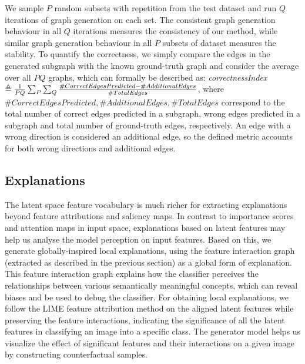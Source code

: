 \documentclass{article}
\newcommand{\ft}[1]{{\textcolor{red}{#1}}}
\newcommand{\ftcom}[2][]{\todo[author=FT, #1]{#2}}
\begin{document}
We sample $P$ random subsets with repetition from the test dataset and run $Q$ iterations of graph generation on each set.
The consistent graph generation behaviour in all $Q$ iterations measures the consistency of our method, while similar graph generation behaviour in all $P$ subsets of dataset measures the stability.
To quantify the correctness, we simply compare the edges in the generated subgraph with the known ground-truth graph and consider the average over all $PQ$ graphs, which can formally be described as: \textit{correctnessIndex} $ \triangleq \frac{1}{PQ} \sum_%
P\sum_%
Q\frac{\#CorrectEdgesPredicted - \#AdditionalEdges}{\#TotalEdges}$, where $\#CorrectEdgesPredicted, \#AdditionalEdges, \#TotalEdges$ correspond to the total number of correct edges predicted in a subgraph, wrong edges predicted in a subgraph and total number of ground-truth edges, respectively.
An edge with a wrong direction is considered an additional edge, so the defined metric accounts for both wrong directions and additional edges. 


\subsection{Explanations}
\label{subsec:exp}
The latent space feature vocabulary is much richer for extracting explanations beyond feature attributions and saliency maps. 
In contrast to importance scores and attention maps in input space, explanations based on latent features may help us analyse the model perception on input features.
Based on this, we generate globally-inspired local explanations, using the feature interaction graph (extracted as described in the previous section) as a global form of explanation. 
This feature interaction graph explains how the classifier perceives the relationships between various semantically meaningful concepts, which can reveal biases and be used to debug the classifier.
For obtaining local explanations, we follow the LIME \cite{lime} feature attribution method on the aligned latent features while preserving the feature interactions, indicating the significance of all the latent features in classifying an image into a specific class.
The generator model helps us visualize the effect of significant features and their interactions on a given image by constructing counterfactual samples.
\end{document}
